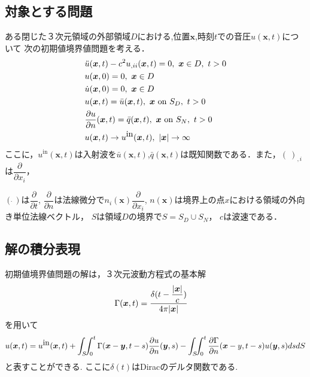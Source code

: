 \documentclass[dvipdfmx]{ampbt}
\def\vector#1{\mbox{\boldmath $#1$}}
\begin{document}
\subsection{対象とする問題}
\label{q}
ある閉じた３次元領域の外部領域$D$における,位置$\bm{x}$,時刻$t$での音圧$u(\bm{x},t)$について
次の初期値境界値問題を考える．
\begin{align}
&\ddot{u}(\bm{x},t)-c^2 u_{,ii}(\bm{x},t)=0,\  \bm{x} \in D,\ t>0 \\
&u(\bm{x},0)=0,\  \vector{x} \in D \\
&\dot{u}(\bm{x},0)=0,\  \vector{x} \in D \\
\label{eq:u_y}
&u(\vector{x},t)=\bar{u}(\bm{x},t),\  \vector{x}\  \mbox{on} \ S_D,\ t>0 \\
\label{eq:q_y}
&\frac{\partial{u}}{\partial{n}} (\bm{x},t)=\bar{q}(\bm{x},t),\  \bm{x}\  \mbox{on} \ S_N,\ t>0 \\
&u(\bm{x},t) \to u^{\mbox{in}}(\bm{x},t),\ |\vector{x}| \to \infty
\end{align}
ここに，$u^{\mbox{in}}(\bm{x},t)$は入射波を$\bar{u}(\bm{x},t)$,$\bar{q}(\bm{x},t)$は既知関数である．また，$(\ )_{,i}$は$\dfrac{\partial{}}{\partial{x_i}}$，

$(\dot{\ })$は$\dfrac{\partial{}}{\partial{t}}$,
$\dfrac{\partial{}}{\partial{n}}$は法線微分で$n_i(\bm{x}) \dfrac{\partial{}}{\partial{x_i}}$,
$n(\bm{x})$は境界上の点$x$における領域の外向き単位法線ベクトル，
$S$は領域$D$の境界で$S=S_D \cup S_N$，
$c$は波速である．

\subsection{解の積分表現}
初期値境界値問題の解は，３次元波動方程式の基本解
\begin{align}
&\Gamma(\bm{x},t) = \displaystyle \frac{\delta(t-\dfrac{|\vector{x}|}{c})}{4\pi|\vector{x}|}
\end{align}
を用いて
\begin{equation}
  \label{eq:境界積分方程式}
u(\bm{x},t) = u^{\mbox{in}}(\vector{x},t) + \int_S\!\!\int_0^t \Gamma(\bm{x}-\vector{y},t-s) \frac{\partial u}{\partial n}(\vector{y},s) - \int_S\!\!\int_0^t \frac{\partial \Gamma}{\partial n}(\bm{x}-y,t-s) u(\vector{y},s) ds dS
\end{equation}
と表すことができる.
ここに$\delta(t)$はDiracのデルタ関数である.
\end{document}

